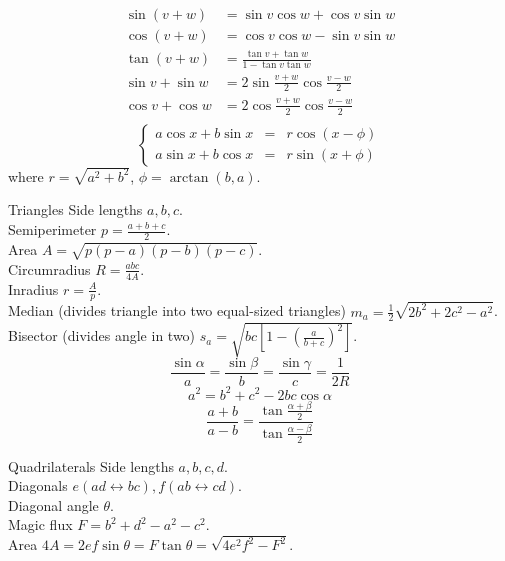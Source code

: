 \clearpage
{}
\categorycontents{}




\begin{align*}
  \sin(v+w) &= \sin v \cos w + \cos v \sin w \\
  \cos(v+w) &= \cos v \cos w  - \sin v \sin w  \\
  \tan(v+w) &= \frac{\tan v +\tan w }{1-\tan v \tan w }\\
  \sin v +\sin w  &= 2\sin\frac{v+w}{2}\cos\frac{v-w}{2}\\
  \cos v + \cos w & = 2 \cos \frac{v+w}{2} \cos \frac{v-w}{2}\\
\end{align*}
$$
\left\{\begin{array}{rcl}
a\cos x + b \sin x &=& r\cos(x - \phi)\\
a\sin x + b \cos x &=& r\sin(x + \phi)
\end{array}\right.
$$
where $r = \sqrt{a^2+b^2}$, $\phi = \arctan(b,a)$.

\begin{algorithm}{Triangles}
\desc
Side lengths $a, b, c$.\\
Semiperimeter $p =\frac{a+b+c}{2}$.\\
Area $A = \sqrt{p(p-a)(p-b)(p-c)}$.\\
Circumradius $R = \frac{abc}{4A}$.\\
Inradius $r = \frac{A}{p}$.\\
Median (divides triangle into two equal-sized triangles) $m_a =
\frac{1}{2}\sqrt{2b^2+2c^2-a^2}$.\\
Bisector (divides angle in two) $s_a = \sqrt{bc\left[1-\left(\frac{a}{b+c}\right)^2\right]}$.
$$\frac{\sin \alpha}{a} = \frac{\sin \beta}{b} = \frac{\sin \gamma}{c} = \frac{1}{2R}$$
$$a^2 = b^2 + c^2 - 2bc\cos \alpha$$
$$\frac{a+b}{a-b}= \frac{\tan\frac{\alpha+\beta}{2}}{\tan\frac{\alpha-\beta}{2}}$$
\end{algorithm}

\begin{algorithm}{Quadrilaterals}
\desc
Side lengths $a, b, c, d$.\\
Diagonals $e (ad \leftrightarrow bc), f (ab \leftrightarrow cd)$.\\
Diagonal angle $\theta$.\\
Magic flux $F = b^2+d^2-a^2-c^2$.\\
Area $4A = 2ef\sin \theta = F\tan \theta = \sqrt{4e^2f^2 - F^2}$.\\

\end{algorithm}


